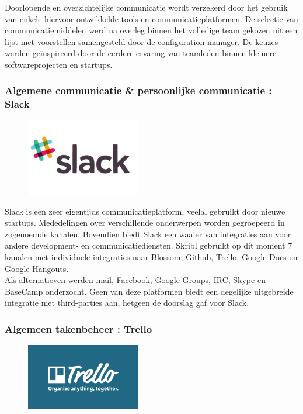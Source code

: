 \documentclass{article}
\begin{document}
Doorlopende en overzichtelijke communicatie wordt verzekerd door het gebruik van enkele hiervoor ontwikkelde tools en communicatieplatformen. De selectie van communicatiemiddelen werd na overleg binnen het volledige team gekozen uit een lijst met voorstellen samengesteld door de configuration manager. De keuzes werden ge\"{i}nspireerd door de eerdere ervaring van teamleden binnen kleinere softwareprojecten en startups. 

\subsubsection*{Algemene communicatie \& persoonlijke communicatie : Slack}
\begin{figure}[h!]
\centering
 \includegraphics[width=50mm]{slack.png}
\end{figure}

\noindent Slack is een zeer eigentijds communicatieplatform, veelal gebruikt door nieuwe startups. Mededelingen over verschillende onderwerpen worden gegroepeerd in zogenoemde kanalen. Bovendien biedt Slack een waaier van integraties aan voor andere development- en communicatiediensten. Skribl gebruikt op dit moment 7 kanalen met individuele integraties naar Blossom, Github, Trello, Google Docs en Google Hangouts.\\
\noindent  Als alternatieven werden mail, Facebook, Google Groups, IRC, Skype en BaseCamp onderzocht. Geen van deze platformen biedt een degelijke uitgebreide integratie met third-parties aan, hetgeen de doorslag gaf voor Slack.

\clearpage

\subsubsection*{Algemeen takenbeheer : Trello}

\begin{figure}[h!]
\centering
 \includegraphics[width=50mm]{trello_logo.png}
\end{figure}
\end{document}

